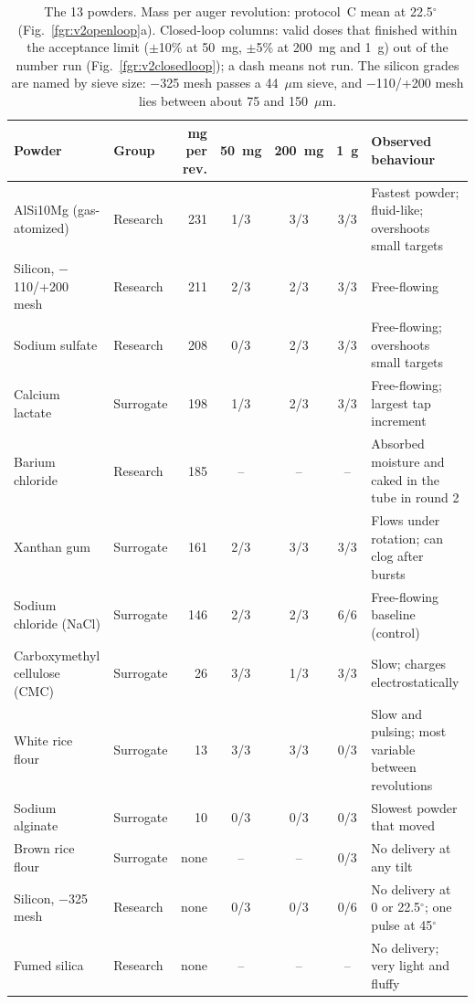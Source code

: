 \documentclass[twoside,twocolumn,9pt]{article}
\begin{document}
\begin{table}[t]
\small
  \caption{\ The 13 powders. Mass per auger revolution: protocol~C mean at 22.5$^\circ$ (Fig.~\ref{fgr:v2openloop}a). Closed-loop columns: valid doses that finished within the acceptance limit ($\pm$10\% at 50~mg, $\pm$5\% at 200~mg and 1~g) out of the number run (Fig.~\ref{fgr:v2closedloop}); a dash means not run. The silicon grades are named by sieve size: $-$325 mesh passes a 44~$\mu$m sieve, and $-$110/+200 mesh lies between about 75 and 150~$\mu$m.}
  \label{tbl:v2powders}
  \begin{tabular*}{\textwidth}{@{\extracolsep{\fill}}llrccc p{5.4cm}}
    \hline
    Powder & Group & mg per rev. & 50~mg & 200~mg & 1~g & Observed behaviour \\
    \hline
    AlSi10Mg (gas-atomized) & Research & 231 & 1/3 & 3/3 & 3/3 & Fastest powder; fluid-like; overshoots small targets \\
    Silicon, $-$110/+200 mesh & Research & 211 & 2/3 & 2/3 & 3/3 & Free-flowing \\
    Sodium sulfate & Research & 208 & 0/3 & 2/3 & 3/3 & Free-flowing; overshoots small targets \\
    Calcium lactate & Surrogate & 198 & 1/3 & 2/3 & 3/3 & Free-flowing; largest tap increment \\
    Barium chloride & Research & 185 & -- & -- & -- & Absorbed moisture and caked in the tube in round 2 \\
    Xanthan gum & Surrogate & 161 & 2/3 & 3/3 & 3/3 & Flows under rotation; can clog after bursts \\
    Sodium chloride (NaCl) & Surrogate & 146 & 2/3 & 2/3 & 6/6 & Free-flowing baseline (control) \\
    Carboxymethyl cellulose (CMC) & Surrogate & 26 & 3/3 & 1/3 & 3/3 & Slow; charges electrostatically \\
    White rice flour & Surrogate & 13 & 3/3 & 3/3 & 0/3 & Slow and pulsing; most variable between revolutions \\
    Sodium alginate & Surrogate & 10 & 0/3 & 0/3 & 0/3 & Slowest powder that moved \\
    Brown rice flour & Surrogate & none & -- & -- & 0/3 & No delivery at any tilt \\
    Silicon, $-$325 mesh & Research & none & 0/3 & 0/3 & 0/6 & No delivery at 0 or 22.5$^\circ$; one pulse at 45$^\circ$ \\
    Fumed silica & Research & none & -- & -- & -- & No delivery; very light and fluffy \\
    \hline
  \end{tabular*}
\end{table}
\end{document}
